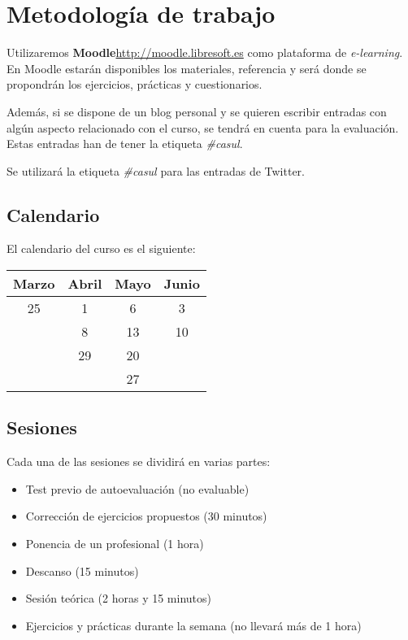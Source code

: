 \documentclass[a4paper]{article}
\begin{document}
  \section{Metodología de trabajo}
  Utilizaremos \textbf{Moodle}\footnotesize{\url{http://moodle.libresoft.es}} como plataforma de \textit{e-learning}.\\
  En Moodle estarán disponibles los materiales, referencia y será donde se propondrán los ejercicios, prácticas y cuestionarios.

  Además, si se dispone de un blog personal y se quieren escribir entradas con algún aspecto relacionado con el curso, se tendrá en cuenta para la evaluación. Estas entradas han de tener la etiqueta \textit{\#casul}.

  Se utilizará la etiqueta \textit{\#casul} para las entradas de Twitter.
    
    \subsection{Calendario}
    El calendario del curso es el siguiente: 
    \medskip
    \begin{tabular}{| c | c | c | c |}
      \hline
      Marzo & Abril & Mayo & Junio \\
      \hline
      25 & 1 & 6 & 3 \\
      & 8 & 13 & 10 \\
      & 29 & 20 & \\
      & & 27 & \\
      \hline
    \end{tabular}

    \subsection{Sesiones}
      Cada una de las sesiones se dividirá en varias partes:
      \begin{itemize}
        \item Test previo de autoevaluación (no evaluable)
        \item Corrección de ejercicios propuestos (30 minutos)
        \item Ponencia de un profesional (1 hora)
        \item Descanso (15 minutos)
        \item Sesión teórica (2 horas y 15 minutos)
        \item Ejercicios y prácticas durante la semana (no llevará más de 1 hora)
      \end{itemize}
\end{document}
